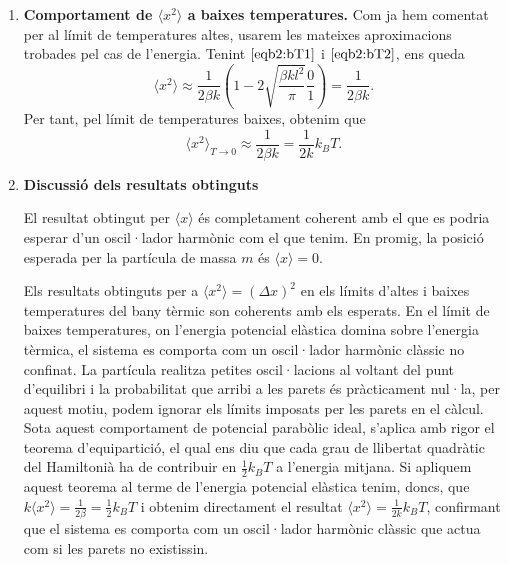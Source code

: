 \documentclass[a4paper, 10pt]{article}
\begin{document}
\begin{enumerate}
\begin{enumerate}
	\begin{equation}
		\boxed{\langle x^2 \rangle_{T\rightarrow \infty} \approx  \frac{1}{3}l^2}.
	\end{equation}
	\item \textbf{Comportament de $\langle x^2 \rangle$ a baixes temperatures.}
	Com ja hem comentat per al límit de temperatures altes, usarem les mateixes aproximacions trobades pel cas de l'energia. Tenint $\eqref{eqb2:bT1}$ i $\eqref{eqb2:bT2}$, ens queda 
	\begin{equation}
		\langle x^2 \rangle \approx  \frac{1}{2\beta k}\left( 1 - 2\sqrt{\frac{\beta k l^2}{\pi}}\frac{0}{1}\right) =  \frac{1}{2\beta k}.
	\end{equation}
	Per tant, pel límit de temperatures baixes, obtenim que
	\begin{equation}
		\boxed{\langle x^2 \rangle_{T\rightarrow 0} \approx \frac{1}{2\beta k} = \frac{1}{2k}k_BT}.
	\end{equation}
	
	\item \textbf{Discussió dels resultats obtinguts}
	
	El resultat obtingut per $\langle x \rangle$ és completament coherent amb el que es podria esperar d'un oscil·lador harmònic com el que tenim. En promig, la posició esperada per la partícula de massa $m$ és $\langle x \rangle=0$.
	
	Els resultats obtinguts per a $\langle x^2 \rangle = (\Delta x)^2$ en els límits d'altes i baixes temperatures del bany tèrmic son coherents amb els esperats. En el límit de baixes temperatures, on l'energia potencial elàstica domina sobre l'energia tèrmica, el sistema es comporta com un oscil·lador harmònic clàssic no confinat. La partícula realitza petites oscil·lacions al voltant del punt d'equilibri i la probabilitat que arribi a les parets és pràcticament nul·la, per aquest motiu, podem ignorar els límits imposats per les parets en el càlcul. Sota aquest comportament de potencial parabòlic ideal, s'aplica amb rigor el teorema d'equipartició, el qual ens diu que cada grau de llibertat quadràtic del Hamiltonià ha de contribuir en $\frac{1}{2}k_BT$ a l'energia mitjana. Si apliquem aquest teorema al terme de l'energia potencial elàstica tenim, doncs, que $k \langle x^2 \rangle = \frac{1}{2\beta} = \frac{1}{2}k_BT$ i obtenim directament el resultat $\langle x^2 \rangle = \frac{1}{2k} k_BT$, confirmant que el sistema es comporta com un oscil·lador harmònic clàssic que actua com si les parets no existissin. 
	

\end{enumerate}
\end{enumerate}
\end{document}
